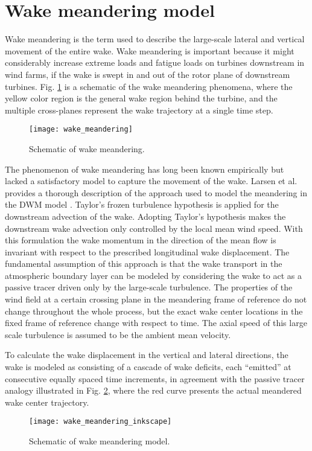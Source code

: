\documentclass{umthesis}
\begin{document}
\section{Wake meandering model} \label{sec:wake_meandering}
Wake meandering is the term used to describe the large-scale lateral and vertical movement of the entire wake. Wake meandering is important because it might considerably increase extreme loads and fatigue loads on turbines downstream in wind farms, if the wake is swept in and out of the rotor plane of downstream turbines. Fig. \ref{fig:wake_meandering} is a schematic of the wake meandering phenomena, where the yellow color region is the general wake region behind the turbine, and the multiple cross-planes represent the wake trajectory at a single time step.

\begin{figure}
  \centering
  \texttt{[image: wake\_meandering]}
  \caption{Schematic of wake meandering.}\label{fig:wake_meandering}
\end{figure}

The phenomenon of wake meandering has long been known empirically but lacked a satisfactory model to capture the movement of the wake. Larsen et al. provides a thorough description of the approach used to model the meandering in the DWM model \cite{Larsen_meandering}. Taylor's frozen turbulence hypothesis is applied for the downstream advection of the wake. Adopting Taylor's hypothesis makes the downstream wake advection only controlled by the local mean wind speed. With this formulation the wake momentum in the direction of the mean flow is invariant with respect to the prescribed longitudinal wake displacement. The fundamental assumption of this approach is that the wake transport in the atmospheric boundary layer can be modeled by considering the wake to act as a passive tracer driven only by the large-scale turbulence. The properties of the wind field at a certain crossing plane in the meandering frame of reference do not change throughout the whole process, but the exact wake center locations in the fixed frame of reference change with respect to time. The axial speed of this large scale turbulence is assumed to be the ambient mean velocity.

To calculate the wake displacement in the vertical and lateral directions, the wake is modeled as consisting of a cascade of wake deficits, each “emitted” at consecutive equally spaced time increments, in agreement with the passive tracer analogy \cite{Larsen_meandering} illustrated in Fig. \ref{fig:wake_meandering_inkscape}, where the red curve presents the actual meandered wake center trajectory.
\begin{figure}
  \centering
  \texttt{[image: wake\_meandering\_inkscape]}
  \caption{Schematic of wake meandering model.}\label{fig:wake_meandering_inkscape}
\end{figure}
\end{document}
